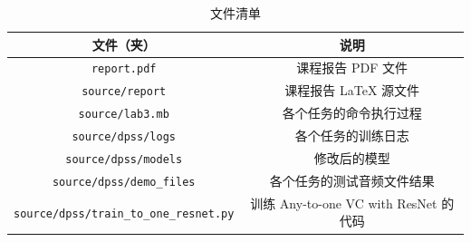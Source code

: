 \documentclass[degree=project,degree-type=project,cjk-font=noto]{thuthesis}
\begin{document}
\begin{table}[htb]
  \centering
  \caption{文件清单}
  \label{tab:files}
  \begin{tabular}{cc}
    \toprule
    \textbf{文件（夹）}         & \textbf{说明}  \\
    \midrule
    \texttt{report.pdf} & 课程报告 PDF 文件 \\
    \texttt{source/report}           & 课程报告 LaTeX 源文件 \\
    \texttt{source/lab3.mb}        & 各个任务的命令执行过程 \\
    \texttt{source/dpss/logs} & 各个任务的训练日志 \\
    \texttt{source/dpss/models} & 修改后的模型 \\
    \texttt{source/dpss/demo\_files} & 各个任务的测试音频文件结果 \\
    \texttt{source/dpss/train\_to\_one\_resnet.py} & 训练 Any-to-one VC with ResNet 的代码 \\
    \bottomrule
  \end{tabular}
\end{table}
\end{document}
